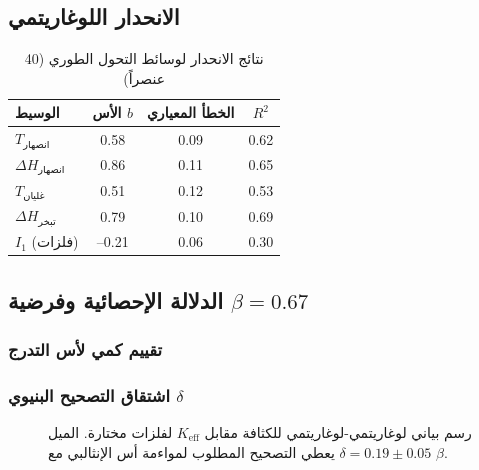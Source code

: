 \documentclass[11pt,a4paper]{article}
\newcommand{\Keff}{K_{\mathrm{eff}}}
\begin{document}
	\subsection{الانحدار اللوغاريتمي}
	\begin{table}[htbp]
		\centering
		\caption{نتائج الانحدار لوسائط التحول الطوري (40 عنصراً)}
		\label{tab:regression}
		\begin{tabular}{@{}lccc@{}}
			\toprule
			\textbf{الوسيط} & \textbf{الأس }\(b\) & \textbf{الخطأ المعياري} & \textbf{\(R^2\)} \\
			\midrule
			\(T_{\text{انصهار}}\)   & 0.58 & 0.09 & 0.62 \\
			\(\Delta H_{\text{انصهار}}\) & 0.86 & 0.11 & 0.65 \\
			\(T_{\text{غليان}}\)   & 0.51 & 0.12 & 0.53 \\
			\(\Delta H_{\text{تبخر}}\) & 0.79 & 0.10 & 0.69 \\
			\(I_1\) (فلزات)      & --0.21 & 0.06 & 0.30 \\
			\bottomrule
		\end{tabular}
	\end{table}
	
	\subsection{الدلالة الإحصائية وفرضية \(\beta = 0.67\)}
	\subsubsection{تقييم كمي لأس التدرج}
	\subsubsection{اشتقاق التصحيح البنيوي \(\delta\)}
	
	\begin{figure}[htbp]
		\centering
		\caption{رسم بياني لوغاريتمي-لوغاريتمي للكثافة مقابل \(\Keff\) لفلزات مختارة. الميل \(\delta = 0.19 \pm 0.05\) يعطي التصحيح المطلوب لمواءمة أس الإنثالبي مع \(\beta\).}
		\label{fig:density_scaling}
	\end{figure}
	
\end{document}
